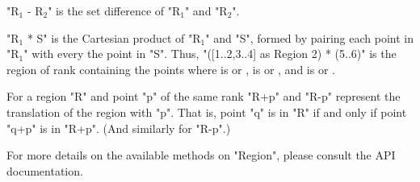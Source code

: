 \xcdmath"R$_1$ - R$_2$" is the set difference of \xcdmath"R$_1$" and
\xcdmath"R$_2$".

\xcdmath"R$_1$ * S" is the Cartesian product of \xcdmath"R$_1$" and
\xcdmath"S",  formed by pairing each point in \xcdmath"R$_1$" with every the point in \xcdmath"S".
Thus, \xcd"([1..2,3..4] as Region 2) * (5..6)"
is the region of rank  containing the points 
where  is  or , 
 is  or , and
 is  or . 


For a region \xcdmath"R" and point \xcdmath"p" of the same rank 
\xcdmath"R+p" and \xcdmath"R-p" represent the translation of the region
with \xcdmath"p". That is, point \xcdmath"q" is in 
\xcdmath"R" if and only if point \xcdmath"q+p" is in \xcdmath"R+p". (And similarly
for \xcdmath"R-p".)



For more details on the available methods on \xcdmath"Region", please
consult the API documentation.
